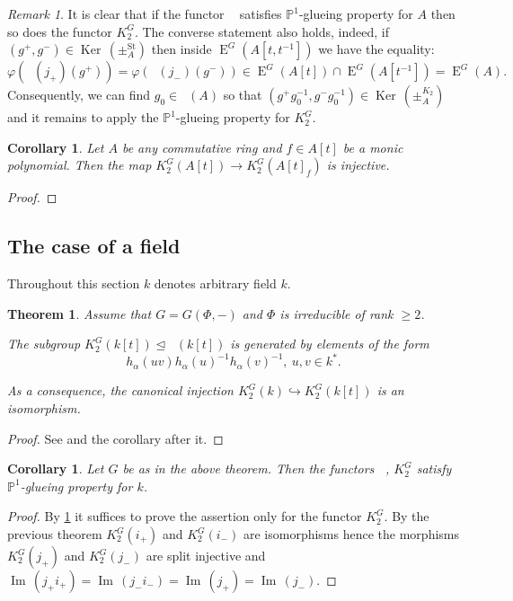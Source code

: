 \documentclass[oneside,12pt]{amsart}
\newtheorem{thm}{Theorem}
\numberwithin{equation}{section}
\numberwithin{lem}{section}
\newtheorem{cor}[lem]{Corollary}
\theoremstyle{definition}
\theoremstyle{remark}
\newtheorem{rem}[lem]{Remark}
\DeclareMathOperator{\St}{St^G}
\DeclareMathOperator{\EE}{E}
\DeclareMathOperator{\Bigker}{Ker\,}
\DeclareMathOperator{\im}{Im\,}
\newcommand{\Stb}{\mathrm{St}}
\newcommand{\Pro}{\mathbb{P}}
\begin{document}
\begin{rem} \label{rem:stk2} It is clear that if the functor $\St$ satisfies $\Pro^1$-glueing property for $A$ then so does the functor $K_2^G$.
 The converse statement also holds, indeed, if $(g^+, g^-)\in\Bigker(\pm^{\Stb}_A)$ then inside $\EE^G(A[t, t^{-1}])$ we have the equality:
 $$\varphi(\St(j_+)(g^+)) = \varphi(\St(j_-)(g^-)) \in \EE^G(A[t]) \cap \EE^G(A[t^{-1}]) = \EE^G(A).$$
 Consequently, we can find $g_0 \in \St(A)$ so that $(g^+ g_0^{-1}, g^- g_0^{-1}) \in \Bigker(\pm_A^{K_2})$ and
 it remains to apply the $\Pro^1$-glueing property for $K_2^G$. \end{rem}

\begin{cor} Let $A$ be any commutative ring and $f\in A[t]$ be a monic polynomial.
Then the map $K_2^G(A[t])\to K_2^G(A[t]_f)$ is injective. \end{cor}
\begin{proof}
\end{proof}

\subsection{The case of a field}
Throughout this section $k$ denotes arbitrary field $k$.
\begin{thm} \label{thm:k[t]}
Assume that $G=G(\Phi, -)$ and $\Phi$ is irreducible of rank $\geq 2$.
\begin{thmlist} \item \label{satz1} The subgroup $K_2^G(k[t]) \trianglelefteq \St(k[t])$ is generated by elements of the form 
  $$h_\alpha(uv) h_\alpha(u)^{-1} h_\alpha(v)^{-1},\ u,v\in k^*.$$
 \item As a consequence, the canonical injection $K_2^G(k) \hookrightarrow K_2^G(k[t])$ is an isomorphism. \end{thmlist} \end{thm}
\begin{proof} See \cite[Satz~1]{Re75} and the corollary after it. \end{proof}

\begin{cor}\label{cor:k[t]inj} Let $G$ be as in the above theorem. Then the functors $\St$, $K_2^G$ satisfy $\Pro^1$-glueing property for $k$. \end{cor}
\begin{proof} By \cref{rem:stk2} it suffices to prove the assertion only for the functor $K_2^G$.
By the previous theorem $K_2^G(i_+)$ and $K_2^G(i_-)$ are isomorphisms hence the morphisms $K_2^G(j_+)$ and $K_2^G(j_-)$ are split injective
and $\im(j_+i_+) = \im (j_-i_-) = \im(j_+) = \im(j_-)$. \end{proof}
\end{document}
